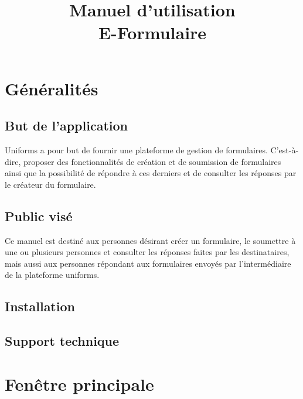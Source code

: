 \documentclass[a4paper,11pt,final]{report}
\title{\textbf{Manuel d'utilisation}\\E-Formulaire}
\author{}
\date{}
\begin{document}
\maketitle
\setcounter{page}{2}
\tableofcontents 
\chapter{Généralités}
\section{But de l'application}
Uniforms a pour but de fournir une plateforme de gestion de formulaires. C'est-à-dire, proposer des fonctionnalités de création et de soumission de formulaires ainsi que la possibilité de répondre à ces derniers et de consulter les réponses par le créateur du formulaire.

\section{Public visé}
Ce manuel est destiné aux personnes désirant créer un formulaire, le soumettre à une ou plusieurs personnes et consulter les réponses faites par les destinataires, mais aussi aux personnes répondant aux formulaires envoyés par l'intermédiaire de la plateforme uniforms.

\section{Installation}

\section{Support technique}

\chapter{Fenêtre principale}
\end{document}
